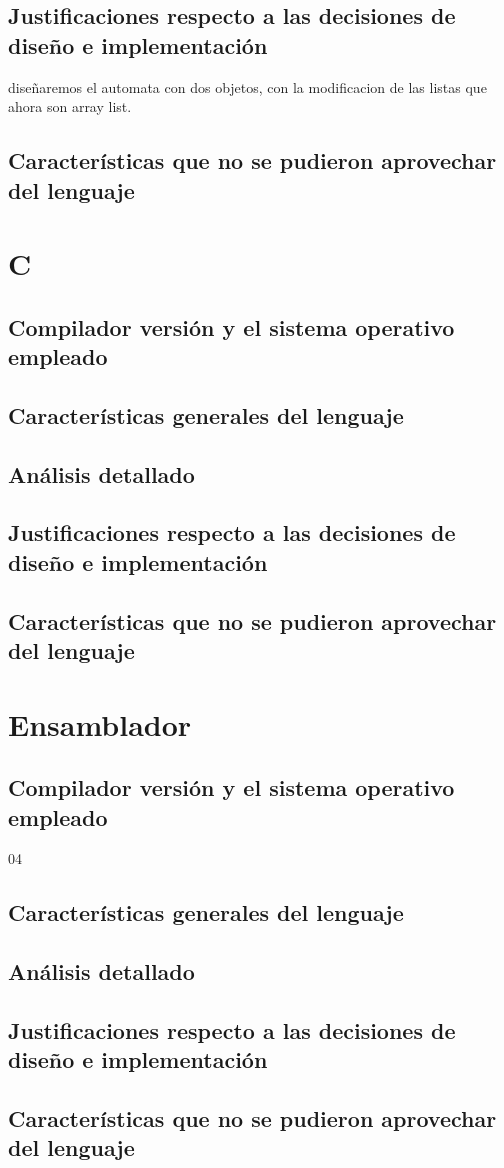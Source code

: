 \documentclass[12pt,a4paper]{article}
\begin{document}
    \subsection{Justificaciones respecto a las decisiones de diseño e implementación}
    diseñaremos el automata con dos objetos, con la modificacion de las listas que ahora son array list.
    \subsection{Características que no se pudieron aprovechar del lenguaje}
      \section{C}
       \subsection{Compilador versión y el sistema operativo empleado}
        \subsection{Características generales del lenguaje}
        \subsection{Análisis detallado}
        \subsection{Justificaciones respecto a las decisiones de diseño e implementación}
        \subsection{Características que no se pudieron aprovechar del lenguaje}
          \section{Ensamblador}
           \subsection{Compilador versión y el sistema operativo empleado}04
            \subsection{Características generales del lenguaje}
            \subsection{Análisis detallado}
            \subsection{Justificaciones respecto a las decisiones de diseño e implementación}
            \subsection{Características que no se pudieron aprovechar del lenguaje}
\end{document}

